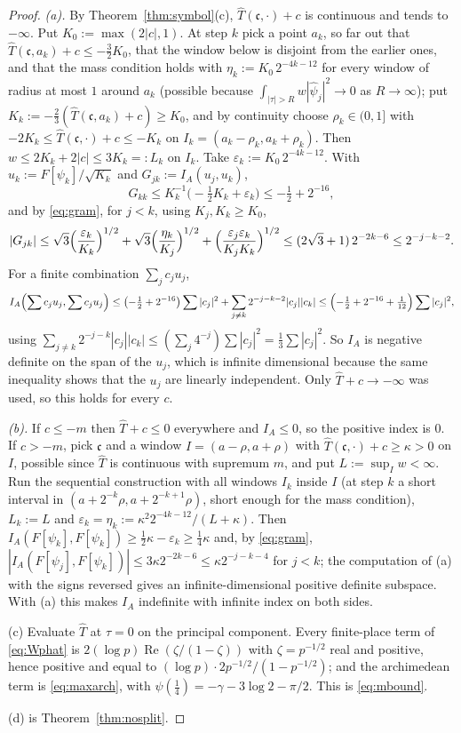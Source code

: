 \documentclass[11pt]{amsart}
\theoremstyle{definition}
\theoremstyle{remark}
\newcommand{\Rel}{\operatorname{Re}}
\newcommand{\Th}{\widehat{T}}
\begin{document}
\begin{proof}
\emph{(a).}  By Theorem~\ref{thm:symbol}(c), $\Th(\mathfrak c,\cdot)+c$ is
continuous and tends to $-\infty$.  Put $K_0:=\max(2|c|,1)$.  At step $k$ pick
a point $a_k$, so far out that $\Th(\mathfrak c,a_k)+c\le-\tfrac32K_0$, that
the window below is disjoint from the earlier ones, and that the mass condition
holds with $\eta_k:=K_0\,2^{-4k-12}$ for every window of radius at most $1$
around $a_k$ (possible because $\int_{|\tau|>R}w|\widehat\psi_j|^{2}\to0$ as
$R\to\infty$); put $K_k:=-\tfrac23(\Th(\mathfrak
c,a_k)+c)\ge K_0$, and by continuity choose $\rho_k\in(0,1]$ with
$-2K_k\le\Th(\mathfrak c,\cdot)+c\le-K_k$ on $I_k=(a_k-\rho_k,a_k+\rho_k)$.
Then $w\le2K_k+2|c|\le3K_k=:L_k$ on $I_k$.  Take
$\varepsilon_k:=K_0\,2^{-4k-12}$.  With $u_k:=F[\psi_k]/\sqrt{K_k}$ and
$G_{jk}:=I_A(u_j,u_k)$,
\[
G_{kk}\le K_k^{-1}\bigl(-\tfrac12K_k+\varepsilon_k\bigr)\le-\tfrac12+2^{-16},
\]
and by \eqref{eq:gram}, for $j<k$, using $K_j,K_k\ge K_0$,
\[
|G_{jk}|\le\sqrt3\Bigl(\frac{\varepsilon_k}{K_k}\Bigr)^{1/2}
+\sqrt3\Bigl(\frac{\eta_k}{K_j}\Bigr)^{1/2}
+\Bigl(\frac{\varepsilon_j\varepsilon_k}{K_jK_k}\Bigr)^{1/2}
\le(2\sqrt3+1)\,2^{-2k-6}\le2^{-j-k-2}.
\]
For a finite combination $\sum_jc_ju_j$,
\[
I_A\Bigl(\sum c_ju_j,\sum c_ju_j\Bigr)\le\bigl(-\tfrac12+2^{-16}\bigr)\sum|c_j|^{2}
+\sum_{j\ne k}2^{-j-k-2}|c_j||c_k|
\le\Bigl(-\tfrac12+2^{-16}+\tfrac1{12}\Bigr)\sum|c_j|^{2},
\]
using $\sum_{j\ne k}2^{-j-k}|c_j||c_k|\le(\sum_j4^{-j})\sum|c_j|^{2}=\tfrac13
\sum|c_j|^{2}$.  So $I_A$ is negative definite on the span of the $u_j$, which
is infinite dimensional because the same inequality shows that the $u_j$ are
linearly independent.  Only $\Th+c\to-\infty$ was used, so this holds for
every $c$.

\emph{(b).}  If $c\le-m$ then $\Th+c\le0$ everywhere and $I_A\le0$, so the
positive index is $0$.  If $c>-m$, pick $\mathfrak c$ and a window
$I=(a-\rho,a+\rho)$ with $\Th(\mathfrak c,\cdot)+c\ge\kappa>0$ on $I$, possible
since $\Th$ is continuous with supremum $m$, and put $L:=\sup_Iw<\infty$.  Run
the sequential construction with all windows $I_k$ inside $I$ (at step $k$ a
short interval in $(a+2^{-k}\rho,a+2^{-k+1}\rho)$, short enough for the mass
condition), $L_k:=L$ and $\varepsilon_k=\eta_k:=\kappa^{2}2^{-4k-12}/(L+\kappa)$.
Then $I_A(F[\psi_k],F[\psi_k])\ge\tfrac12\kappa-\varepsilon_k\ge\tfrac14\kappa$
and, by \eqref{eq:gram}, $|I_A(F[\psi_j],F[\psi_k])|\le3\kappa2^{-2k-6}\le
\kappa2^{-j-k-4}$ for $j<k$; the computation of (a) with the signs reversed
gives an infinite-dimensional positive definite subspace.  With (a) this makes
$I_A$ indefinite with infinite index on both sides.

(c)  Evaluate $\Th$ at $\tau=0$ on the principal component.  Every finite-place
term of \eqref{eq:Wphat} is $2(\log p)\Rel(\zeta/(1-\zeta))$ with
$\zeta=p^{-1/2}$ real and positive, hence positive and equal to
$(\log p)\cdot2p^{-1/2}/(1-p^{-1/2})$; and the archimedean term is
\eqref{eq:maxarch}, with $\psi(\tfrac14)=-\gamma-3\log2-\pi/2$.  This is
\eqref{eq:mbound}.

(d) is Theorem~\ref{thm:nosplit}.
\end{proof}
\end{document}
